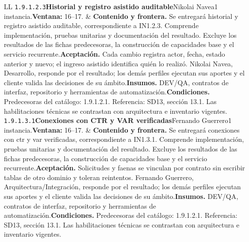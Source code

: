 \begin{longtable}{L{\tabcolsep\relax}L{\tabcolsep\relax}}
\texttt{1.\allowbreak{}9.\allowbreak{}1.\allowbreak{}2.\allowbreak{}3}\newline{}\textbf{Historial y registro asistido auditable}\newline{}Nikolai Navea\newline{}1 instancia.\newline{}\textbf{Ventana:} 16--17. & \textbf{Contenido y frontera.} Se entregará historial y registro asistido auditable, correspondiente a IN1.2.3. Comprende implementación, pruebas unitarias y documentación del resultado. Excluye los resultados de las fichas predecesoras, la construcción de capacidades base y el servicio recurrente.\newline{}\textbf{Aceptación.} Cada cambio registra actor, fecha, estado anterior y nuevo; el ingreso asistido identifica quién lo realizó. Nikolai Navea, Desarrollo, responde por el resultado; los demás perfiles ejecutan sus aportes y el cliente valida las decisiones de su ámbito.\newline{}\textbf{Insumos.} DEV/QA, contratos de interfaz, repositorio y herramientas de automatización.\newline{}\textbf{Condiciones.} Predecesoras del catálogo: 1.9.1.2.1. Referencia: SD13, sección 13.1. Las habilitaciones técnicas se contrastan con arquitectura e inventario vigentes.\\\hline
\texttt{1.\allowbreak{}9.\allowbreak{}1.\allowbreak{}3.\allowbreak{}1}\newline{}\textbf{Conexiones con CTR y VAR verificadas}\newline{}Fernando Guerrero\newline{}1 instancia.\newline{}\textbf{Ventana:} 16--17. & \textbf{Contenido y frontera.} Se entregará conexiones con ctr y var verificadas, correspondiente a IN1.3.1. Comprende implementación, pruebas unitarias y documentación del resultado. Excluye los resultados de las fichas predecesoras, la construcción de capacidades base y el servicio recurrente.\newline{}\textbf{Aceptación.} Solicitudes y faenas se vinculan por contrato sin escribir tablas de otro dominio y toleran reintentos. Fernando Guerrero, Arquitectura/Integración, responde por el resultado; los demás perfiles ejecutan sus aportes y el cliente valida las decisiones de su ámbito.\newline{}\textbf{Insumos.} DEV/QA, contratos de interfaz, repositorio y herramientas de automatización.\newline{}\textbf{Condiciones.} Predecesoras del catálogo: 1.9.1.2.1. Referencia: SD13, sección 13.1. Las habilitaciones técnicas se contrastan con arquitectura e inventario vigentes.\\\hline

\end{longtable}
